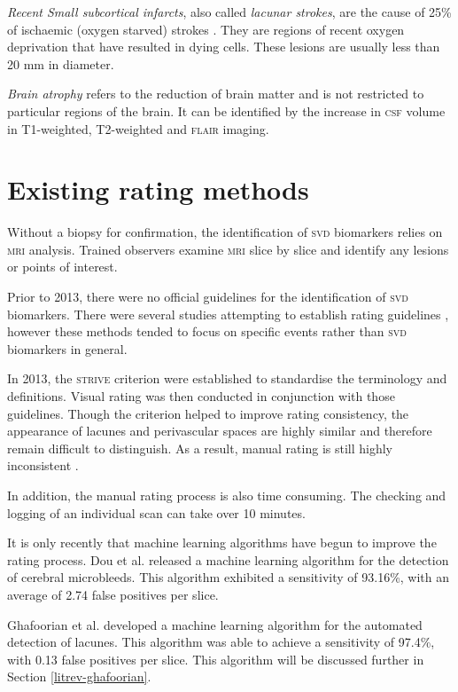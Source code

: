 \textit{Recent Small subcortical infarcts}, also called \textit{lacunar strokes}, are the cause of 25\% of ischaemic (oxygen starved) strokes \cite{WardlawJ.M.2013Nsfr}. They are regions of recent oxygen deprivation that have resulted in dying cells. These lesions are usually less than 20 mm in diameter. 

\textit{Brain atrophy} refers to the reduction of brain matter and is not restricted to particular regions of the brain. It can be identified by the increase in \textsc{csf} volume in T1-weighted, T2-weighted and \textsc{flair} imaging.

\section{Existing rating methods}\label{svd-rating}

Without a biopsy for confirmation, the identification of \textsc{svd} biomarkers relies on \textsc{mri} analysis. Trained observers examine \textsc{mri} slice by slice and identify any lesions or points of interest.

Prior to 2013, there were no official guidelines for the identification of \textsc{svd} biomarkers. There were several studies attempting to establish rating guidelines \cite{AdamsH.H.Hieab2013RMfD, PotterGillian2015CPSV}, however these methods tended to focus on specific events rather than \textsc{svd} biomarkers in general.


In 2013, the \textsc{strive} criterion \cite{WardlawJ.M.2013Nsfr} were established to standardise the terminology and definitions. Visual rating was then conducted in conjunction with those guidelines. Though the criterion helped to improve rating consistency, the appearance of lacunes and perivascular spaces are highly similar and therefore remain difficult to distinguish. As a result, manual rating is still highly inconsistent \cite{PotterGillian2015CPSV}. 

In addition, the manual rating process is also time consuming. The checking and logging of an individual scan can take over 10 minutes.

It is only recently that machine learning algorithms have begun to improve the rating process. Dou et al. \cite{DouQ.2016ADoC} released a machine learning algorithm for the detection of cerebral microbleeds. This algorithm exhibited a sensitivity of 93.16\%, with an average of 2.74 false positives per slice. 

Ghafoorian et al. \cite{GhafoorianM.2017Dml3} developed a machine learning algorithm for the automated detection of lacunes. This algorithm was able to achieve a sensitivity of 97.4\%, with 0.13 false positives per slice. This algorithm will be discussed further in Section \ref{litrev-ghafoorian}.


%